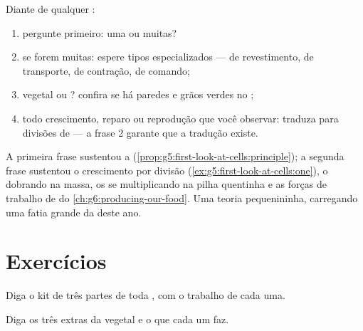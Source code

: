 \begin{method}\label{met:g6:cell-unit-of-life:read}
Diante de qualquer :
\begin{enumerate}
  \item pergunte primeiro: uma  ou muitas?
  \item se forem muitas: espere tipos especializados --- de
        revestimento, de transporte, de contração, de comando;
  \item vegetal ou ? confira se há paredes e grãos verdes no
        ;
  \item todo crescimento, reparo ou reprodução que você observar:
        traduza para divisões de  --- a frase 2 garante que a
        tradução existe.
\end{enumerate}
\end{method}

\begin{example}\label{ex:g6:cell-unit-of-life:atwork}
A primeira frase sustentou a 
(\cref{prop:g5:first-look-at-cells:principle}); a segunda frase sustentou o
crescimento por divisão (\cref{ex:g5:first-look-at-cells:one}), o
 dobrando na massa, os  se multiplicando na
pilha quentinha e as forças de trabalho de  do
\cref{ch:g6:producing-our-food}. Uma teoria pequenininha, carregando
uma fatia grande da  deste ano.
\end{example}

\section{Exercícios}

\begin{exercise}[$\star$]\label{exo:g6:cell-unit-of-life:1}
Diga o kit de três partes de toda , com o trabalho de cada uma.
\end{exercise}

\begin{exercise}[$\star$]\label{exo:g6:cell-unit-of-life:2}
Diga os três extras da  vegetal e o que cada um faz.
\end{exercise}

